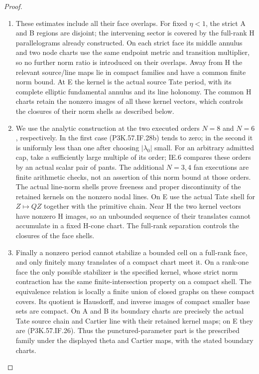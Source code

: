 \begin{proof}
\begin{enumerate}[label=\arabic*.]
\item These estimates include all their face overlaps.
For fixed \(\eta<1\), the strict A and B regions
are disjoint; the intervening sector is covered by
the full-rank H parallelograms already constructed.
On each strict face its middle annulus and two node
charts use the same endpoint metric and transition
multiplier, so no further norm ratio is introduced
on their overlaps. Away from H the relevant
source/line maps lie in compact families and have
a common finite norm bound. At E the kernel is
the actual source Tate period, with its complete
elliptic fundamental annulus and its line holonomy.
The common H charts retain the nonzero images of
all these kernel vectors, which controls the
closures of their norm shells as described below.

\item We use the analytic construction at the two executed
orders \(N=8\) and \(N=6\), respectively. In the first
case (P3K.57.IF.28b) tends to zero; in the second it is
uniformly less than one after choosing \(|\lambda_0|\)
small. For an arbitrary admitted cap, take a sufficiently
large multiple of its order; IE.6 compares these orders
by an actual scalar pair of pants. The additional
\(N=3,4\) fan executions are finite arithmetic checks,
not an assertion of this norm bound at those orders.
The actual line-norm shells prove freeness and proper
discontinuity of the retained kernels on the nonzero
nodal lines. On E use the actual Tate shell for
\(Z\mapsto QZ\) together with the primitive chain.
Near H the two kernel vectors have nonzero H images,
so an unbounded sequence of their translates cannot
accumulate in a fixed H-cone chart. The full-rank
separation controls the closures of the face shells.

\item Finally a nonzero period cannot stabilize a bounded
cell on a full-rank face, and only finitely many
translates of a compact chart meet it. On a rank-one
face the only possible stabilizer is the specified
kernel, whose strict norm contraction has the same
finite-intersection property on a compact shell.
The equivalence relation is locally a finite union
of closed graphs on these compact covers. Its quotient
is Hausdorff, and inverse images of compact smaller
base sets are compact. On A and B its boundary charts
are precisely the actual Tate source chain and
Cartier line with their retained kernel maps; on E
they are (P3K.57.IF.26). Thus the punctured-parameter part
is the prescribed family under the displayed theta
and Cartier maps, with the stated boundary charts.


\end{enumerate}
\end{proof}
